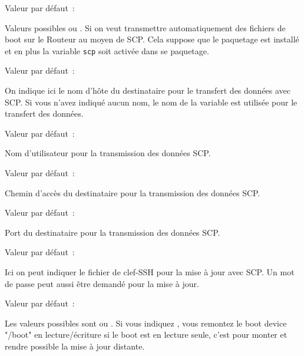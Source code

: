 \begin{description}

  Valeur par défaut~: 

  Valeurs possibles  ou . Si on veut transmettre
  automatiquement des fichiers de boot sur le Routeur au moyen de SCP.
  Cela suppose que le paquetage  est installé et
  en plus la variable \texttt{scp} soit activée dans se paquetage.


  Valeur par défaut~: 

  On indique ici le nom d'hôte du destinataire pour le transfert des
  données avec SCP. Si vous n'avez indiqué aucun nom, le nom de la
  variable  est utilisée pour le
  transfert des données.


  Valeur par défaut~: 

  Nom d'utilisateur pour la transmission des données SCP.


  Valeur par défaut~: 

  Chemin d'accès du destinataire pour la transmission des données SCP.


  Valeur par défaut~: 

  Port du destinataire pour la transmission des données SCP.


  Valeur par défaut~: 

  Ici on peut indiquer le fichier de clef-SSH pour la mise à jour
  avec SCP. Un mot de passe peut aussi être demandé pour la mise à jour.


  Valeur par défaut~: 

  Les valeurs possibles sont  ou . Si vous indiquez
  , vous remontez le boot device "/boot" en lecture/écriture
  si le boot est en lecture seule, c'est pour monter et rendre possible
  la mise à jour distante.


\end{description}
